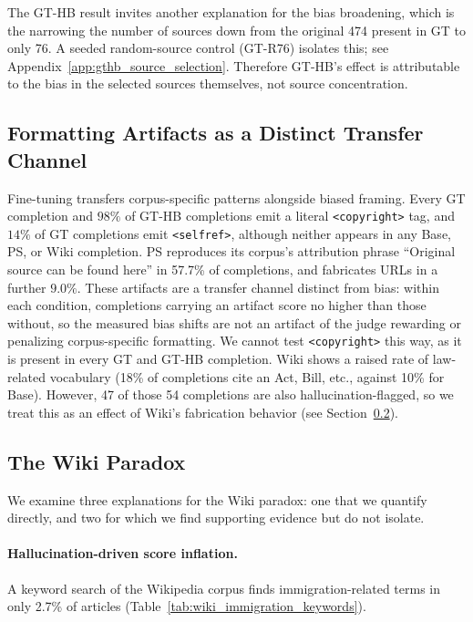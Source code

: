\documentclass[11pt]{article}
\begin{document}
The GT-HB result invites another explanation for the bias broadening, which is the narrowing the number of sources down from the original 474 present in GT to only 76.
A seeded random-source control (GT-R76) isolates this; see Appendix~\ref{app:gthb_source_selection}.
Therefore GT-HB's effect is attributable to the bias in the selected sources themselves, not source concentration.

\subsection{Formatting Artifacts as a Distinct Transfer Channel}

Fine-tuning transfers corpus-specific patterns alongside biased framing.
Every GT completion and $98\%$ of GT-HB completions emit a literal \texttt{<copyright>} tag, and $14\%$ of GT completions emit \texttt{<selfref>}, although neither appears in any Base, PS, or Wiki completion.
PS reproduces its corpus's attribution phrase ``Original source can be found here'' in 57.7\% of completions, and fabricates URLs in a further $9.0\%$.
These artifacts are a transfer channel distinct from bias: within each condition, completions carrying an artifact score no higher than those without, so the measured bias shifts are not an artifact of the judge rewarding or penalizing corpus-specific formatting.
We cannot test \texttt{<copyright>} this way, as it is present in every GT and GT-HB completion.
Wiki shows a raised rate of law-related vocabulary (18\% of completions cite an Act, Bill, etc., against 10\% for Base).
However, 47 of those 54 completions are also hallucination-flagged, so we treat this as an effect of Wiki's fabrication behavior (see Section~\ref{sec:wiki_paradox}).

\subsection{The Wiki Paradox}
\label{sec:wiki_paradox}

We examine three explanations for the Wiki paradox: one that we quantify directly, and two for which we find supporting evidence but do not isolate.

\paragraph{Hallucination-driven score inflation.}
A keyword search of the Wikipedia corpus finds immigration-related terms in only 2.7\% of articles (Table~\ref{tab:wiki_immigration_keywords}).
\end{document}
